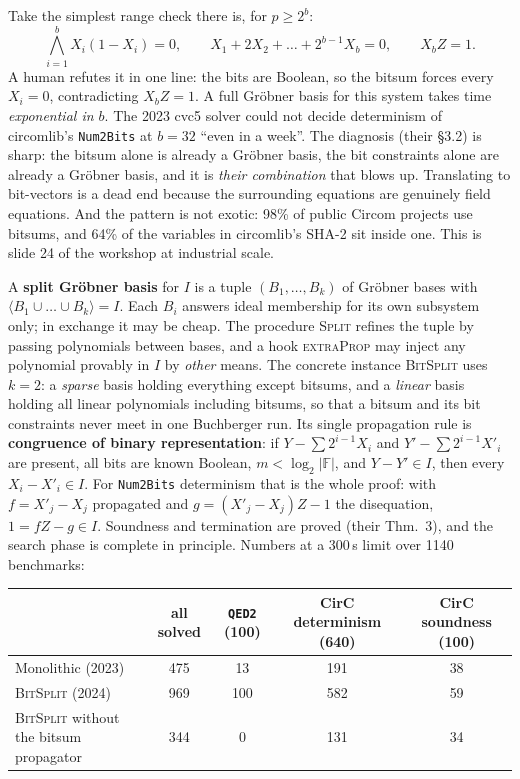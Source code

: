 \documentclass[10pt]{article}
\newcommand{\F}{\mathbb F}\newcommand{\wb}{\overline w}
\newcommand{\sect}[1]{\par\vspace{4pt}{\large\bfseries #1}\par\nobreak\vspace{1pt}}
\begin{document}
\sect{8. The bitsum wall}
Take the simplest range check there is, for $p\ge 2^b$:
\[
\textstyle\bigwedge_{i=1}^{b} X_i(1-X_i)=0,\qquad X_1+2X_2+\dots+2^{b-1}X_b=0,\qquad X_bZ=1 .
\]
A human refutes it in one line: the bits are Boolean, so the bitsum forces every $X_i=0$, contradicting $X_bZ=1$.
A full Gr\"obner basis for this system takes time \emph{exponential in $b$}. The 2023 cvc5 solver could not decide determinism of
circomlib's \texttt{Num2Bits} at $b=32$ ``even in a week''. The diagnosis (their \S3.2) is sharp: the bitsum alone is already a
Gr\"obner basis, the bit constraints alone are already a Gr\"obner basis, and it is \emph{their combination} that blows up.
Translating to bit-vectors is a dead end because the surrounding equations are genuinely field equations. And the pattern is not
exotic: 98\% of public Circom projects use bitsums, and 64\% of the variables in circomlib's SHA-2 sit inside one. This is slide 24
of the workshop at industrial scale.

\sect{9. The fix: several small bases plus one non-algebraic fact}
A \textbf{split Gr\"obner basis} for $I$ is a tuple $(B_1,\dots,B_k)$ of Gr\"obner bases with $\langle B_1\cup\dots\cup
B_k\rangle=I$. Each $B_i$ answers ideal membership for its own subsystem only; in exchange it may be cheap. The procedure
\textsc{Split} refines the tuple by passing polynomials between bases, and a hook \textsc{extraProp} may inject any polynomial
provably in $I$ by \emph{other} means. The concrete instance \textsc{BitSplit} uses $k=2$: a \emph{sparse} basis holding everything
except bitsums, and a \emph{linear} basis holding all linear polynomials including bitsums, so that a bitsum and its bit constraints
never meet in one Buchberger run. Its single propagation rule is \textbf{congruence of binary representation}: if $Y-\sum 2^{i-1}X_i$
and $Y'-\sum 2^{i-1}X'_i$ are present, all bits are known Boolean, $m<\log_2|\F|$, and $Y-Y'\in I$, then every $X_i-X'_i\in I$.
For \texttt{Num2Bits} determinism that is the whole proof: with $f=X'_j-X_j$ propagated and $g=(X'_j-X_j)Z-1$ the disequation,
$1=fZ-g\in I$. Soundness and termination are proved (their Thm.~3), and the search phase is complete in principle. Numbers at a
300\,s limit over 1140 benchmarks:
\begin{center}\small\begin{tabular}{@{}lcccc@{}}\toprule
& all solved & \texttt{QED2} (100) & CirC determinism (640) & CirC soundness (100)\\\midrule
Monolithic (2023) & 475 & 13 & 191 & 38\\
\textsc{BitSplit} (2024) & 969 & 100 & 582 & 59\\
\textsc{BitSplit} without the bitsum propagator & 344 & 0 & 131 & 34\\
\bottomrule\end{tabular}\end{center}
\end{document}
